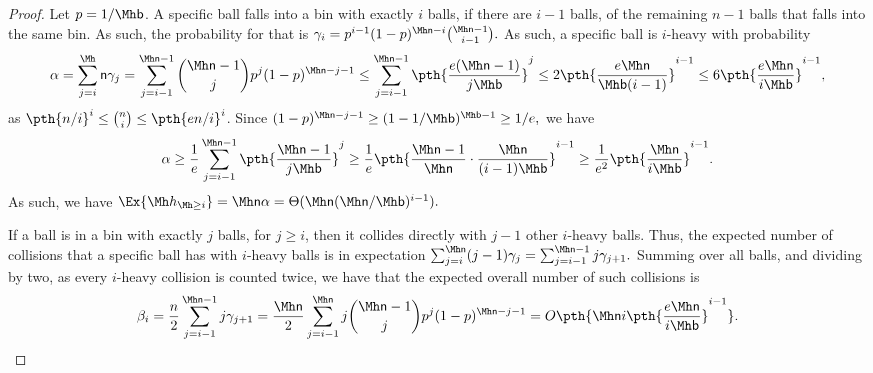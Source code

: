 \begin{proof}
    Let $p = 1/\nbins$. A specific ball falls into a bin with exactly
    $i$ balls, if there are $i-1$ balls, of the remaining $n-1$ balls
    that falls into the same bin. As such, the probability for that is
    \begin{math}
        \gamma_i = p^{i-1}(1-p)^{\nballs-i} \binom{\nballs-1}{i-1}.
    \end{math}
    As such, a specific ball is $i$-heavy with probability
    \begin{equation*}
        \alpha%
        =%
        \sum_{j=i}^\nballs \gamma_j %
        =%
        \sum_{j=i-1}^{\nballs-1} \binom{\nballs-1}{j}
        p^j(1-p)^{\nballs-j-1}%
        \leq%
        \sum_{j=i-1}^{\nballs-1}  \pth{\frac{e(\nballs-1)}{j \nbins}}^j%
        \leq%
        2 \pth{\frac{e \nballs}{\nbins (i-1)}}^{i-1}
        \leq%
        6 \pth{\frac{e \nballs}{i \nbins}}^{i-1},
    \end{equation*}
    as $\pth{ n/i}^i \leq \binom{n}{i} \leq \pth{ e n/i}^i$. Since
    \begin{math}
        (1-p)^{\nballs-j-1}%
        \geq%
        (1-1/\nbins)^{\nbins-1}%
        \geq%
        1/e,
    \end{math}
    we have
    \begin{equation*}
      \alpha%
      \geq%
        \frac{1}{e}
        \sum_{j=i-1}^{\nballs-1}  \pth{\frac{\nballs-1}{j \nbins}}^j\\%
      \geq%
        \frac{1}{e}
        \pth{\frac{\nballs-1}{\nballs}\cdot\frac{\nballs}{(i-1) \nbins}}^{i-1}%
        \geq%
        \frac{1}{e^2}
        \pth{\frac{\nballs}{i \nbins}}^{i-1}.%
    \end{equation*}
    As such, we have
    \begin{math}
        \Ex{\NHX{i}} = \nballs \alpha = \Theta(
        \nballs(\nballs/\nbins)^{i-1} ).
    \end{math}

    If a ball is in a bin with exactly $j$ balls, for $j \geq i$, then
    it collides directly with $j-1$ other $i$-heavy balls. Thus, the
    expected number of collisions that a specific ball has with
    $i$-heavy balls is in expectation
    \begin{math}
        \sum_{j=i}^{\nballs} (j-1) \gamma_j%
        =%
        \sum_{j=i-1}^{\nballs-1} j \gamma_{j+1}.
    \end{math}
    Summing over all balls, and dividing by two, as every $i$-heavy
    collision is counted twice, we have that the expected overall
    number of such collisions is
    \begin{equation*}
        \beta_i%
        =%
        \frac{n}{2}
        \sum_{j=i-1}^{\nballs-1} j \gamma_{j+1}\\
        =%
        \frac{\nballs}{2} \sum_{j=i-1}^{\nballs}
        j \binom{\nballs-1}{j} p^j(1-p)^{\nballs-j-1}%
        =%
        O \pth{ \nballs i \pth{\frac{e \nballs}{i \nbins}}^{i-1}}.
    \end{equation*}
\end{proof}



